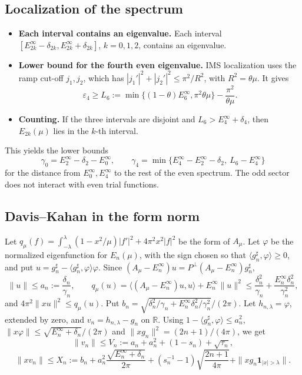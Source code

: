 \documentclass[11pt]{amsart}
\theoremstyle{remark}
\numberwithin{equation}{section}
\newcommand{\R}{\mathbb{R}}
\begin{document}
\subsection{Localization of the spectrum}
\begin{itemize}
\item \textbf{Each interval contains an eigenvalue.} Each interval $[E_{2k}^\infty-\delta_{2k},E_{2k}^\infty+\delta_{2k}]$, $k=0,1,2$, contains an eigenvalue.
\item \textbf{Lower bound for the fourth even eigenvalue.} IMS localization uses the ramp cut-off $j_1,j_2$, which has $|j_1'|^2+|j_2'|^2\le\pi^2/R^2$, with $R^2=\theta\mu$. It gives
\[
\varepsilon_4\ge L_6:=\min\{(1-\theta)E_6^\infty,\pi^2\theta\mu\}-\frac{\pi^2}{\theta\mu}.
\]
\item \textbf{Counting.} If the three intervals are disjoint and $L_6>E_4^\infty+\delta_4$, then $E_{2k}(\mu)$ lies in the $k$-th interval.
\end{itemize}
This yields the lower bounds
\[
\gamma_0=E_2^\infty-\delta_2-E_0^\infty,\qquad\gamma_4=\min\{E_4^\infty-E_2^\infty-\delta_2,\ L_6-E_4^\infty\}
\]
for the distance from $E_0^\infty,E_4^\infty$ to the rest of the even spectrum. The odd sector does not interact with even trial functions.

\subsection{Davis--Kahan in the form norm}
Let $q_\mu(f)=\int_{-\lambda}^\lambda(1-x^2/\mu)|f'|^2+4\pi^2x^2|f|^2$ be the form of $A_\mu$. Let $\varphi$ be the normalized eigenfunction for $E_n(\mu)$, with the sign chosen so that $\langle g_n^\sharp,\varphi\rangle\ge0$, and put $u=g_n^\sharp-\langle g_n^\sharp,\varphi\rangle\varphi$. Since $(A_\mu-E_n^\infty)u=P^\perp(A_\mu-E_n^\infty)g_n^\sharp$,
\[
\|u\|\le a_n:=\frac{\delta_n}{\gamma_n},\qquad q_\mu(u)=\langle(A_\mu-E_n^\infty)u,u\rangle+E_n^\infty\|u\|^2\le\frac{\delta_n^2}{\gamma_n}+\frac{E_n^\infty\delta_n^2}{\gamma_n^2},
\]
and $4\pi^2\|xu\|^2\le q_\mu(u)$. Put $b_n=\sqrt{\delta_n^2/\gamma_n+E_n^\infty\delta_n^2/\gamma_n^2}/(2\pi)$. Let $h_{n,\lambda}=\varphi$, extended by zero, and $v_n=h_{n,\lambda}-g_n$ on $\R$. Using $1-\langle g_n^\sharp,\varphi\rangle\le a_n^2$, $\|x\varphi\|\le\sqrt{E_n^\infty+\delta_n}/(2\pi)$ and $\|xg_n\|^2=(2n+1)/(4\pi)$, we get
\[
\|v_n\|\le V_n:=a_n+a_n^2+(1-s_n)+\sqrt{\tau_n},
\]
\[
\|xv_n\|\le X_n:=b_n+a_n^2\frac{\sqrt{E_n^\infty+\delta_n}}{2\pi}+(s_n^{-1}-1)\sqrt{\frac{2n+1}{4\pi}}+\|xg_n\mathbf 1_{|x|>\lambda}\|.
\]
\end{document}
